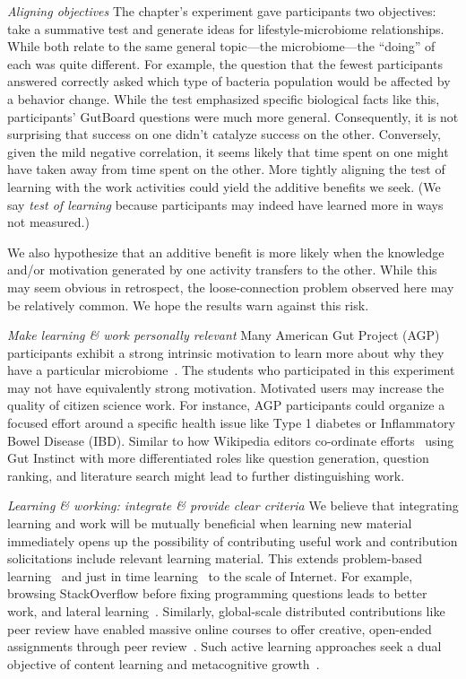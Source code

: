 \textit{Aligning objectives}
The chapter’s experiment gave participants two objectives: take a summative test and generate ideas for lifestyle-microbiome relationships. While both relate to the same general topic---the microbiome---the “doing” of each was quite different. For example, the question that the fewest participants answered correctly asked which type of bacteria population would be affected by a behavior change. While the test emphasized specific biological facts like this, participants’ GutBoard questions were much more general. Consequently, it is not surprising that success on one didn’t catalyze success on the other. Conversely, given the mild negative correlation, it seems likely that time spent on one might have taken away from time spent on the other. More tightly aligning the test of learning with the work activities could yield the additive benefits we seek. (We say \textit{test of learning} because participants may indeed have learned more in ways not measured.) 

We also hypothesize that an additive benefit is more likely when the knowledge and/or motivation generated by one activity transfers to the other. While this may seem obvious in retrospect, the loose-connection problem observed here may be relatively common. We hope the results warn against this risk.

\textit{Make learning \& work personally relevant}
Many American Gut Project (AGP) participants exhibit a strong intrinsic motivation to learn more about why they have a particular microbiome~\cite{Debelius2016}. The students who participated in this experiment may not have equivalently strong motivation. Motivated users may increase the quality of citizen science work. For instance, AGP participants could organize a focused effort around a specific health issue like Type 1 diabetes or Inflammatory Bowel Disease (IBD). Similar to how Wikipedia editors co-ordinate efforts~\cite{Krieger2009} using Gut Instinct with more differentiated roles like question generation, question ranking, and literature search might lead to further distinguishing work.

\textit{Learning \& working: integrate \& provide clear criteria}
We believe that integrating learning and work will be mutually beneficial when learning new material immediately opens up the possibility of contributing useful work and contribution solicitations include relevant learning material. This extends problem-based learning~\cite{Savery1995} and just in time learning~\cite{Bolton1999} to the scale of Internet. For example, browsing StackOverflow before fixing programming questions leads to better work, and lateral learning~\cite{Mamykina2011}. Similarly, global-scale distributed contributions like peer review have enabled massive online courses to offer creative, open-ended assignments through peer review~\cite{Kulkarni2013peer}. Such active learning approaches seek a dual objective of content learning and metacognitive growth~\cite{Crouch2001}.
 
